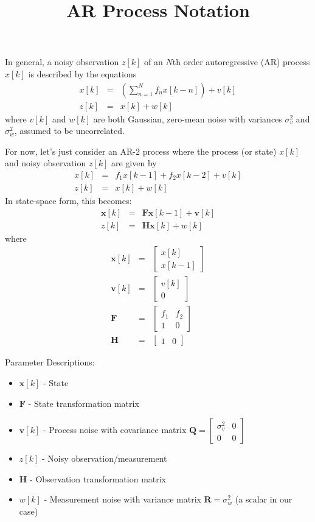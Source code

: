 \documentclass[11pt]{article}
\renewcommand{\vec}[1]{\ensuremath{\boldsymbol{#1}}}
\begin{document}
\title{AR Process Notation}
\author{}
\date{}
\maketitle

In general, a noisy observation $z[k]$ of an $N$th order autoregressive (AR) process $x[k]$ is described by the equations
\begin{eqnarray*}
x[k]&=&\left(\sum_{n=1}^N f_{n}x[k-n]\right) + v[k]\\
z[k]&=&x[k] + w[k]
\end{eqnarray*}
where $v[k]$ and $w[k]$ are both Gaussian, zero-mean noise with variances $\sigma_v^2$ and $\sigma_w^2$, assumed to be uncorrelated.

For now, let's just consider an AR-2 process where the process (or state) $x[k]$ and noisy observation $z[k]$ are given by
\begin{eqnarray*}
x[k]&=&f_1x[k-1]+ f_2x[k-2] + v[k]\\
z[k]&=&x[k] + w[k]
\end{eqnarray*}
In state-space form, this becomes:
\begin{eqnarray*}
\vec{x}[k]&=&\vec{Fx}[k-1]+\vec{v}[k]\\
z[k]&=&\vec{Hx}[k]+w[k]
\end{eqnarray*}
where
\begin{eqnarray*}
\vec{x}[k]&=&\begin{bmatrix}
    x[k]\\ x[k-1]
\end{bmatrix}\\
\vec{v}[k]&=&\begin{bmatrix}
    v[k]\\ 0
\end{bmatrix}\\
\vec{F}&=&\begin{bmatrix}
    f_1       & f_2 \\
    1       & 0 
\end{bmatrix}\\
\vec{H}&=&\begin{bmatrix}
    1       & 0 
\end{bmatrix}
\end{eqnarray*}

Parameter Descriptions: %
\begin{itemize}
    \item $\vec{x}[k]$ - State
    \item $\vec{F}$ - State transformation matrix
    \item $\vec{v}[k]$ - Process noise with covariance matrix $\vec{Q}=\begin{bmatrix}
    \sigma_v^2       & 0 \\
    0       & 0 
\end{bmatrix}$
    \item $z[k]$ - Noisy observation/measurement
    \item $\vec{H}$ - Observation transformation matrix
   \item $w[k]$ - Measurement noise with variance matrix $\vec{R}=\sigma_w^2$ (a scalar in our case)
\end{itemize}
\end{document}
